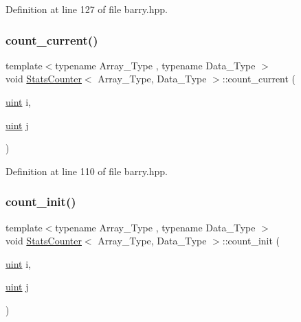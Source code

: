 Definition at line 127 of file barry.\+hpp.

\mbox{\label{classbarry_1_1_stats_counter_ab81166f7cb67eeaecc469016d237019a}} 
\subsubsection{\texorpdfstring{count\+\_\+current()}{count\_current()}}
{\footnotesize\ttfamily template$<$typename Array\+\_\+\+Type , typename Data\+\_\+\+Type $>$ \\
void \hyperlink{classbarry_1_1_stats_counter}{Stats\+Counter}$<$ Array\+\_\+\+Type, Data\+\_\+\+Type $>$\+::count\+\_\+current (\begin{DoxyParamCaption}\item[{\hyperlink{namespacebarry_a11dfc53ddb4672278319aa04f1e09a6c}{uint}}]{i,  }\item[{\hyperlink{namespacebarry_a11dfc53ddb4672278319aa04f1e09a6c}{uint}}]{j }\end{DoxyParamCaption})\hspace{0.3cm}{\ttfamily [inline]}}



Definition at line 110 of file barry.\+hpp.

\mbox{\label{classbarry_1_1_stats_counter_a19bd5936619e190c0d8918b4f343922e}} 
\subsubsection{\texorpdfstring{count\+\_\+init()}{count\_init()}}
{\footnotesize\ttfamily template$<$typename Array\+\_\+\+Type , typename Data\+\_\+\+Type $>$ \\
void \hyperlink{classbarry_1_1_stats_counter}{Stats\+Counter}$<$ Array\+\_\+\+Type, Data\+\_\+\+Type $>$\+::count\+\_\+init (\begin{DoxyParamCaption}\item[{\hyperlink{namespacebarry_a11dfc53ddb4672278319aa04f1e09a6c}{uint}}]{i,  }\item[{\hyperlink{namespacebarry_a11dfc53ddb4672278319aa04f1e09a6c}{uint}}]{j }\end{DoxyParamCaption})\hspace{0.3cm}{\ttfamily [inline]}}



